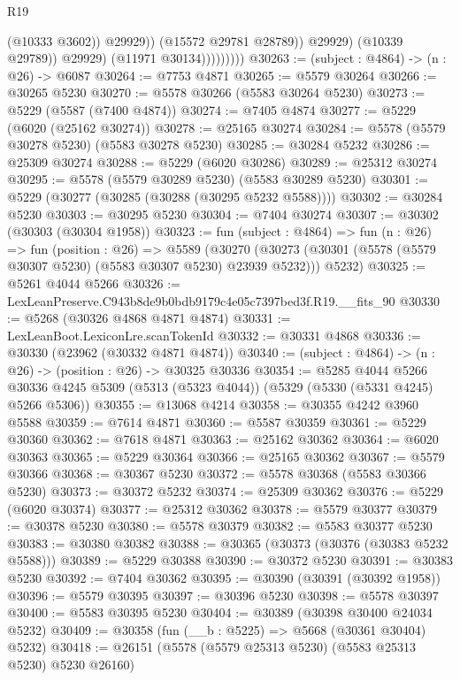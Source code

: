 \begin{lexlean}{R19}
\begin{coremodule}
                                  (@10333 @3602))
                                @29929))
                            (@15572 @29781 @28789))
                          @29929)
                        (@10339 @29789))
                      @29929)
                    (@11971 @30134)))))))))
@30263 := (subject : @4864) -> (n : @26) -> @6087
@30264 := @7753 @4871
@30265 := @5579 @30264
@30266 := @30265 @5230
@30270 := @5578 @30266 (@5583 @30264 @5230)
@30273 := @5229 (@5587 (@7400 @4874))
@30274 := @7405 @4874
@30277 := @5229 (@6020 (@25162 @30274))
@30278 := @25165 @30274
@30284 := @5578 (@5579 @30278 @5230) (@5583 @30278 @5230)
@30285 := @30284 @5232
@30286 := @25309 @30274
@30288 := @5229 (@6020 @30286)
@30289 := @25312 @30274
@30295 := @5578 (@5579 @30289 @5230) (@5583 @30289 @5230)
@30301 := @5229 (@30277 (@30285 (@30288 (@30295 @5232 @5588))))
@30302 := @30284 @5230
@30303 := @30295 @5230
@30304 := @7404 @30274
@30307 := @30302 (@30303 (@30304 @1958))
@30323 := fun (subject : @4864) =>
  fun (n : @26) =>
  fun (position : @26) =>
  @5589
    (@30270 (@30273 (@30301 (@5578 (@5579 @30307 @5230) (@5583 @30307 @5230) @23939 @5232))) @5232)
@30325 := @5261 @4044 @5266
@30326 := LexLeanPreserve.C943b8de9b0bdb9179c4e05c7397bed3f.R19.__fits_90
@30330 := @5268 (@30326 @4868 @4871 @4874)
@30331 := LexLeanBoot.LexiconLre.scanTokenId
@30332 := @30331 @4868
@30336 := @30330 (@23962 (@30332 @4871 @4874))
@30340 := (subject : @4864) -> (n : @26) -> (position : @26) -> @30325 @30336
@30354 := @5285
    @4044
    @5266
    @30336
    @4245
    @5309
    (@5313 (@5323 @4044))
    (@5329 (@5330 (@5331 @4245) @5266 @5306))
@30355 := @13068 @4214
@30358 := @30355 @4242 @3960 @5588
@30359 := @7614 @4871
@30360 := @5587 @30359
@30361 := @5229 @30360
@30362 := @7618 @4871
@30363 := @25162 @30362
@30364 := @6020 @30363
@30365 := @5229 @30364
@30366 := @25165 @30362
@30367 := @5579 @30366
@30368 := @30367 @5230
@30372 := @5578 @30368 (@5583 @30366 @5230)
@30373 := @30372 @5232
@30374 := @25309 @30362
@30376 := @5229 (@6020 @30374)
@30377 := @25312 @30362
@30378 := @5579 @30377
@30379 := @30378 @5230
@30380 := @5578 @30379
@30382 := @5583 @30377 @5230
@30383 := @30380 @30382
@30388 := @30365 (@30373 (@30376 (@30383 @5232 @5588)))
@30389 := @5229 @30388
@30390 := @30372 @5230
@30391 := @30383 @5230
@30392 := @7404 @30362
@30395 := @30390 (@30391 (@30392 @1958))
@30396 := @5579 @30395
@30397 := @30396 @5230
@30398 := @5578 @30397
@30400 := @5583 @30395 @5230
@30404 := @30389 (@30398 @30400 @24034 @5232)
@30409 := @30358 (fun (__b : @5225) => @5668 (@30361 @30404) @5232)
@30418 := @26151 (@5578 (@5579 @25313 @5230) (@5583 @25313 @5230) @5230 @26160)

\end{coremodule}
\end{lexlean}
